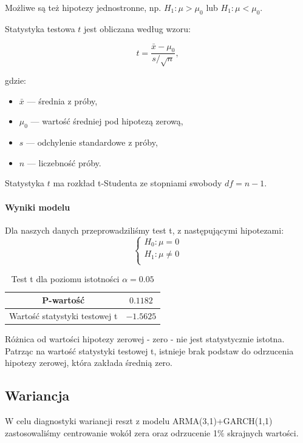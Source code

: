 \documentclass{article}
\begin{document}
{Możliwe są też hipotezy jednostronne, np. \(H_1: \mu > \mu_0\) lub \(H_1: \mu < \mu_0\).

Statystyka testowa \(t\) jest obliczana według wzoru:

\[
t = \frac{\bar{x} - \mu_0}{s / \sqrt{n}},
\]

gdzie:

\begin{itemize}
    \item \(\bar{x}\) — średnia z próby,
    \item \(\mu_0\) — wartość średniej pod hipotezą zerową,
    \item \(s\) — odchylenie standardowe z próby,
    \item \(n\) — liczebność próby.
\end{itemize}

Statystyka \(t\) ma rozkład t-Studenta ze stopniami swobody \(df = n - 1\). \\
\paragraph{Wyniki modelu}
Dla naszych danych przeprowadziliśmy test t, z następującymi hipotezami: \\
\[
\begin{cases}
H_0: \mu = 0  \\
H_1: \mu \neq 0 \\
\end{cases}
\]

\begin{table}[h]
\centering
    \caption{Test t dla poziomu istotności $\alpha = 0.05$}
    \begin{tabular}{|c|c|}
    \hline
    P-wartość & $0.1182$ \\
    \hline
    Wartość statystyki testowej t & $-1.5625$ \\
    \hline
    \end{tabular}
\end{table} 

Różnica od wartości hipotezy zerowej - zero - nie jest statystycznie istotna. Patrząc na wartość statystyki testowej t, istnieje brak podstaw do odrzucenia hipotezy zerowej, która zakłada średnią zero. 

\subsection{Wariancja}
W celu diagnostyki wariancji reszt z modelu ARMA(3,1)+GARCH(1,1) zastosowaliśmy centrowanie wokół zera oraz odrzucenie 1$\%$ skrajnych wartości. 

}
\end{document}
